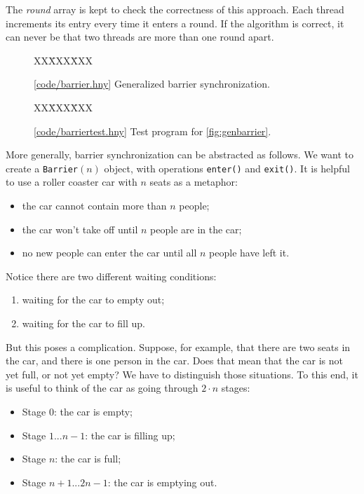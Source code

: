 \documentclass{report}
\newcommand{\harmonysource}[1]{
\begin{tabbing}
XX\=XXX\=XXX\kill
    
\end{tabbing}
}
\newcommand{\harmonylink}[1]{%
[\href{https://harmony.cs.cornell.edu/#1}{\underline{#1}}]%
}
\newenvironment{code}{
\tcolorbox
}{
\endtcolorbox
}
\begin{document}
The \textit{round} array is kept to check the correctness of this
approach.  Each thread increments its entry every time it enters
a round.  If the algorithm is correct, it can never be that two threads
are more than one round apart.

\begin{figure}
\begin{code}
\harmonysource{barrier}
\end{code}
\caption{\harmonylink{code/barrier.hny} Generalized barrier synchronization.}
\label{fig:genbarrier}
\end{figure}

\begin{figure}
\begin{code}
\harmonysource{barriertest}
\end{code}
\caption{\harmonylink{code/barriertest.hny} Test program for \autoref{fig:genbarrier}.}
\label{fig:barriertest}
\end{figure}

More generally, barrier synchronization can be abstracted as follows.
We want to create a \texttt{Barrier}$(n)$ object, with operations
\texttt{enter()} and \texttt{exit()}.  It is helpful to use
a roller coaster car with $n$ seats as a metaphor:
\begin{itemize}
\item the car cannot contain more than $n$ people;
\item the car won't take off until $n$ people are in the car;
\item no new people can enter the car until all $n$ people have left it.
\end{itemize}
Notice there are two different waiting conditions:
\begin{enumerate}
\item waiting for the car to empty out;
\item waiting for the car to fill up.
\end{enumerate}

But this poses a complication.  Suppose, for example, that there are two
seats in the car, and there is one person in the car.  Does that mean that
the car is not yet full, or not yet empty?  We have to distinguish
those situations.  To this end, it is useful to think of the car as going through
$2 \cdot n$ stages:
\begin{itemize}
\item[] Stage 0: the car is empty;
\item[] Stage $1 ... n-1$: the car is filling up;
\item[] Stage $n$: the car is full;
\item[] Stage $n+1 ... 2n - 1$: the car is emptying out.
\end{itemize}
\end{document}
